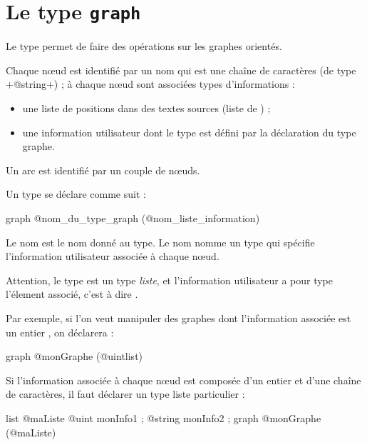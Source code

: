 
\chapter{Le type \texttt{graph}}

Le type  permet de faire des opérations sur les graphes orientés.

Chaque nœud est identifié par un nom qui est une chaîne de caractères (de type \ggs+@string+) ; à chaque nœud sont associées types d'informations :
\begin{itemize}
  \item une liste de positions dans des textes sources (liste de ) ;
  \item une information utilisateur dont le type est défini par la déclaration du type graphe.
\end{itemize}

Un arc est identifié par un couple de nœuds.


Un type  se déclare comme suit :
\begin{galgascode}
graph @nom_du_type_graph (@nom_liste_information) {
}
\end{galgascode}

Le nom  est le nom donné au type. Le nom  nomme un type qui spécifie l'information utilisateur associée à chaque nœud.

Attention, le type  est un type \emph{liste}, et l'information utilisateur a pour type l'élement associé, c'est à dire . 

Par exemple, si l'on veut manipuler des graphes dont l'information associée est un entier , on déclarera :
\begin{galgascode}
graph @monGraphe (@uintlist) {
}
\end{galgascode}

Si l'information associée à chaque nœud est composée d'un entier et d'une chaîne de caractères, il faut déclarer un type liste particulier :
\begin{galgascode}
list @maListe {
  @uint monInfo1 ;
  @string monInfo2 ;
}
graph @monGraphe (@maListe) {
}
\end{galgascode}






